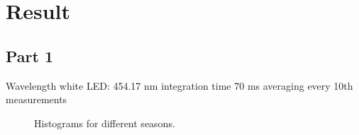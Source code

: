 \section{Result}
\subsection{Part 1}

Wavelength white LED: 454.17 nm 
integration time 70 ms 
averaging every 10th measurements

\begin{figure}[H]
    \centering
    \hfill
    
    \vspace{0.5cm}
    

    
    \caption{Histograms for different seasons.}
    \label{fig:part1}
\end{figure}


